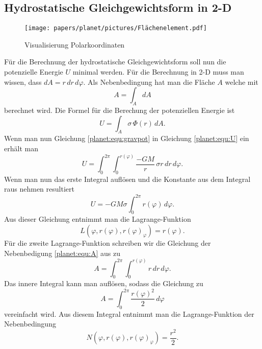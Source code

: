 \subsection{Hydrostatische Gleichgewichtsform in 2-D}
\begin{figure}
	\centering
	\texttt{[image: papers/planet/pictures/Flächenelement.pdf]}
	\caption{Visualisierung Polarkoordinaten}
\end{figure}
Für die Berechnung der hydrostatische Gleichgewichtsform soll nun die potenzielle Energie \(U\) minimal werden.
Für die Berechnung in 2-D muss man wissen, dass \(dA = r \, dr \, d\varphi\).
Als Nebenbedingung hat man die Fläche \(A\) welche mit 
\begin{equation}
	A = \int_{A}^{} dA
	\label{planet:equ:A}
\end{equation}
berechnet wird.
Die Formel für die Berechung der potenziellen Energie ist
\begin{equation*}
	U = \int_{A} \sigma \, \Phi (r) \, dA.
	\label{planet:equ:U}
\end{equation*}
Wenn man nun Gleichung \eqref{planet:equ:gravpot} in Gleichung \eqref{planet:equ:U} ein erhält man
\begin{equation*}
	U = \int_{0}^{2\pi}\int_{0}^{r(\varphi)} \frac{-GM}{r} \, \sigma r \, dr \, d\varphi.
\end{equation*}
Wenn man nun das erste Integral auflösen und die Konstante aus dem Integral raus nehmen resultiert 
\begin{equation}
	U =-GM\sigma \int_{0}^{2\pi} r(\varphi) \, d\varphi .
\end{equation}
Aus dieser Gleichung entnimmt man die Lagrange-Funktion
\begin{equation}
	L(\varphi ,r(\varphi),r(\varphi)_\varphi) = r(\varphi).
\end{equation}
Für die zweite Lagrange-Funktion schreiben wir die Gleichung der Nebenbedigung \eqref{planet:equ:A} aus zu
\begin{equation*}
	A = \int_{0}^{2\pi}\int_{0}^{r(\varphi)} r \, dr \, d\varphi.
\end{equation*}
Das innere Integral kann man auflösen, sodass die Gleichung zu
\begin{equation*}
	A = \int_{0}^{2\pi}\frac{r(\varphi)^2}{2} \, d\varphi
\end{equation*}
vereinfacht wird.
Aus diesem Integral entnimmt man die Lagrange-Funktion der Nebenbedingung
\begin{equation*}
	N(\varphi ,r(\varphi),r(\varphi)_\varphi) = \frac{r^2}{2}.
\end{equation*}

